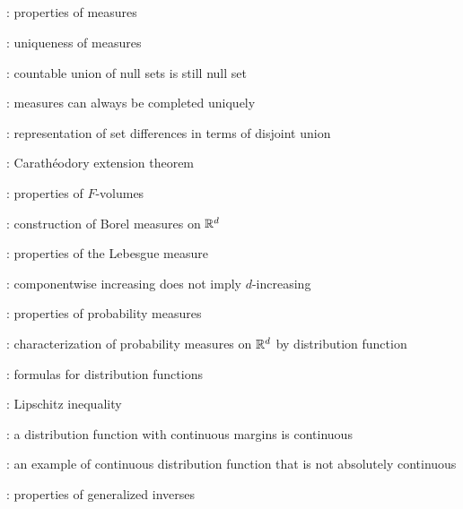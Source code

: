 \subsection*{}
\item {}: properties of measures
\item {}: uniqueness of measures
\item {}: countable union of null sets is still null set
\item {}: measures can always be completed uniquely
\item {}: representation of set differences in terms of disjoint union
\item {}: Carath\'eodory extension theorem
\item {}: properties of \(F\)-volumes
\item {}: construction of Borel measures on \(\mathbb{R}^d\)
\item {}: properties of the Lebesgue measure
\item {}: componentwise increasing does not imply \(d\)-increasing
\item {}: properties of probability measures
\item {}: characterization of probability
measures on \(\mathbb{R}^d\) by distribution function
\item {}: formulas for distribution functions
\item {}: Lipschitz inequality
\item {}: a distribution function with continuous margins is continuous
\item {}: an example of continuous distribution function that is not absolutely continuous
\item {}: properties of generalized inverses
